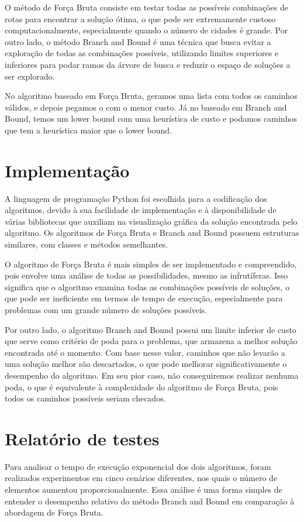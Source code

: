 O método de Força Bruta consiste em testar todas as possíveis combinações de rotas para encontrar a solução ótima, o que pode ser extremamente custoso computacionalmente, especialmente quando o número de cidades é grande. Por outro lado, o método Branch and Bound é uma técnica que busca evitar a exploração de todas as combinações possíveis, utilizando limites superiores e inferiores para podar ramos da árvore de busca e reduzir o espaço de soluções a ser explorado.

No algoritmo baseado em Força Bruta, geramos uma lista com todos os caminhos válidos, e depois pegamos o com o menor custo. Já no baseado em Branch and Bound, temos um lower bound com uma heurística de custo e podamos caminhos que tem a heurística maior que o lower bound.

\section{Implementação}
A linguagem de programação Python foi escolhida para a codificação dos algoritmos, devido à sua facilidade de implementação e à disponibilidade de várias bibliotecas que auxiliam na visualização gráfica da solução encontrada pelo algoritmo. Os algoritmos de Força Bruta e Branch and Bound possuem estruturas similares, com classes e métodos semelhantes.

O algoritmo de Força Bruta é mais simples de ser implementado e compreendido, pois envolve uma análise de todas as possibilidades, mesmo as infrutíferas. Isso significa que o algoritmo examina todas as combinações possíveis de soluções, o que pode ser ineficiente em termos de tempo de execução, especialmente para problemas com um grande número de soluções possíveis.

Por outro lado, o algoritmo Branch and Bound possui um limite inferior de custo que serve como critério de poda para o problema, que armazena a melhor solução encontrada até o momento. Com base nesse valor, caminhos que não levarão a uma solução melhor são descartados, o que pode melhorar significativamente o desempenho do algoritmo. Em seu pior caso, não conseguiremos realizar nenhuma poda, o que é equivalente à complexidade do algoritmo de Força Bruta, pois todos os caminhos possíveis seriam checados.

\section{Relatório de testes}
Para analisar o tempo de execução exponencial dos dois algoritmos, foram realizados experimentos em cinco cenários diferentes, nos quais o número de elementos aumentou proporcionalmente. Essa análise é uma forma simples de entender o desempenho relativo do método Branch and Bound em comparação à abordagem de Força Bruta.

